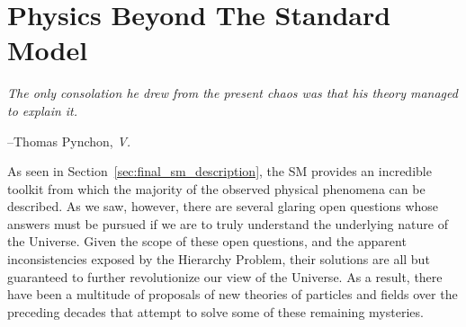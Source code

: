 \chapter{Physics Beyond The Standard Model}
\label{chap:bsm}

\epigraph{\textit{The only consolation he drew from the present chaos was that his theory managed to explain it.}}{--Thomas Pynchon, \textit{V.}}

%


%
%
\cite{2HDMPheno,EWSBMSSM,SUSYPrimer,LightStopsHiggs}
\cite{EWSBProbeRho,PDGRef}
\cite{ColemanMandula,WessZuminoModel,HaagSUSY}

As seen in Section~\ref{sec:final_sm_description}, the SM provides an incredible toolkit
from which the majority of the observed physical phenomena can be described.
As we saw, however, there are several glaring open questions whose answers must be pursued
if we are to truly understand the underlying nature of the Universe.
Given the scope of these open questions, and the apparent inconsistencies exposed by the Hierarchy Problem,
their solutions are all but guaranteed to further revolutionize our view of the Universe.
As a result, there have been a multitude of proposals of new theories of particles and fields over the preceding decades that attempt
to solve some of these remaining mysteries.


